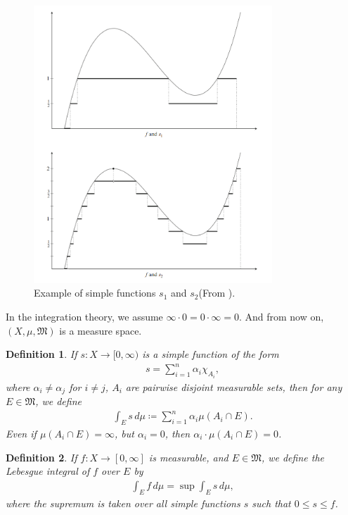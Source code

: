 \documentclass[11pt]{book}
\newtheorem{definition}{Definition}[chapter]
\theoremstyle{definition}
\numberwithin{equation}{chapter}
\begin{document}
\begin{figure}[h]
    \centering
    \includegraphics[width=0.8\textwidth]{simple_function.png}
    \caption{Example of simple functions $s_1$ and $s_2$(From \cite{27}).}
    \label{fig:simple_functions}
\end{figure}

\medskip

In the integration theory, we assume $\infty\cdot 0 = 0 \cdot \infty = 0$. And from now on, $(X,\mu,\mathfrak{M})$ is a measure space.

\medskip

\begin{definition}
If $s:X \to [0,\infty)$ is a simple function of the form 
\begin{align*}
    s = \sum^n_{i=1} \alpha_i \chi_{A_i},
\end{align*}
where $\alpha_i \neq \alpha_j$ for $i \neq j$, $A_i$ are pairwise disjoint measurable sets, then for any $E \in \mathfrak{M}$, we define
\begin{align*}
    \int_E s\, d\mu \coloneqq \sum^n_{i=1} \alpha_i \mu(A_i \cap E).
\end{align*}
Even if $\mu(A_i \cap E) = \infty$, but $\alpha_i = 0$, then $\alpha_i \cdot \mu(A_i \cap E) = 0$.
\end{definition}

\medskip

\begin{definition}
If $f:X \to [0,\infty]$ is measurable, and $E \in \mathfrak{M}$, we define the Lebesgue integral of $f$ over $E$ by
\begin{align*}
    \int_E f\,d\mu = \sup \int_E s\, d\mu,
\end{align*}
where the supremum is taken over all simple functions $s$ such that $0 \leq s \leq f$.
\end{definition}
\end{document}

